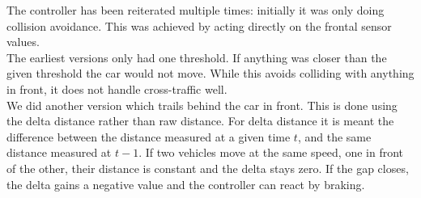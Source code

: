 The controller has been reiterated multiple times: initially it was only doing collision avoidance.
This was achieved by acting directly on the frontal sensor values.\\
The earliest versions only had one threshold. If anything was closer than the given threshold the car would not move.
While this avoids colliding with anything in front, it does not handle cross-traffic well.\\
We did another version which trails behind the car in front.
This is done using the delta distance rather than raw distance.
For delta distance it is meant the difference between the distance measured at a given time $t$, and the same distance measured at $t-1$. 
If two vehicles move at the same speed, one in front of the other, their distance is constant and the delta stays zero.
If the gap closes, the delta gains a negative value and the controller can react by braking. 
